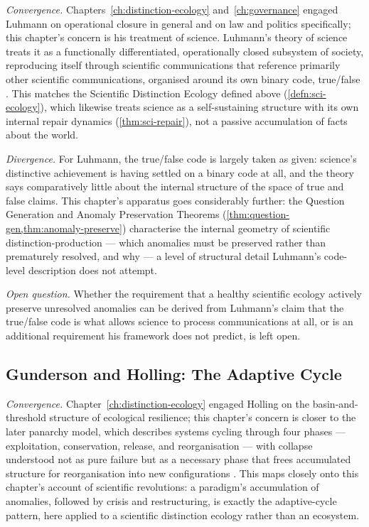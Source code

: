 \documentclass[12pt,twoside,openright]{book}
\begin{document}
\emph{Convergence.} Chapters~\ref{ch:distinction-ecology}
and~\ref{ch:governance} engaged Luhmann on operational closure in
general and on law and politics specifically; this chapter's
concern is his treatment of science. Luhmann's theory of science
treats it as a functionally differentiated, operationally closed
subsystem of society, reproducing itself through scientific
communications that reference primarily other scientific
communications, organised around its own binary code, true/false
\parencite{luhmann1990}. This matches the Scientific Distinction
Ecology defined above (\cref{defn:sci-ecology}), which likewise
treats science as a self-sustaining structure with its own
internal repair dynamics (\cref{thm:sci-repair}), not a passive
accumulation of facts about the world.

\emph{Divergence.} For Luhmann, the true/false code is largely
taken as given: science's distinctive achievement is having
settled on a binary code at all, and the theory says comparatively
little about the internal structure of the space of true and
false claims. This chapter's apparatus goes considerably further:
the Question Generation and Anomaly Preservation Theorems
(\cref{thm:question-gen,thm:anomaly-preserve}) characterise the
internal geometry of scientific distinction-production --- which
anomalies must be preserved rather than prematurely resolved, and
why --- a level of structural detail Luhmann's code-level
description does not attempt.

\emph{Open question.} Whether the requirement that a healthy
scientific ecology actively preserve unresolved anomalies can be
derived from Luhmann's claim that the true/false code is what
allows science to process communications at all, or is an
additional requirement his framework does not predict, is left
open.

\subsection*{Gunderson and Holling: The Adaptive Cycle}

\emph{Convergence.} Chapter~\ref{ch:distinction-ecology} engaged
Holling on the basin-and-threshold structure of ecological
resilience; this chapter's concern is closer to the later
panarchy model, which describes systems cycling through four
phases --- exploitation, conservation, release, and
reorganisation --- with collapse understood not as pure failure
but as a necessary phase that frees accumulated structure for
reorganisation into new configurations \parencite{gunderson2002}.
This maps closely onto this chapter's account of scientific
revolutions: a paradigm's accumulation of anomalies, followed by
crisis and restructuring, is exactly the adaptive-cycle pattern,
here applied to a scientific distinction ecology rather than an
ecosystem.
\end{document}
